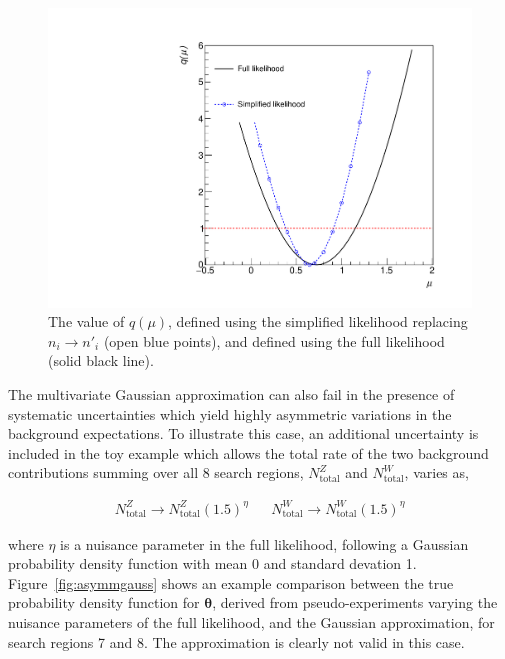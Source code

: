 \begin{figure}[hbt]
  \begin{center} 
   \includegraphics[width=1.5\cmsFigWidth]{figures/r_bias.pdf}
   \caption{The value of $q(\mu)$,  defined using the simplified likelihood replacing $n_{i}\rightarrow n'_{i}$ 
   (open blue points), and defined using the full likelihood (solid black line).}
   \label{fig:likelihoodscan_bias} 
  \end{center}
\end{figure}

The multivariate Gaussian approximation can also fail in the presence of systematic uncertainties which yield highly asymmetric 
variations in the background expectations. To illustrate this case, an additional uncertainty is included in the toy example which 
allows the total rate of the two background contributions summing over all 8 search regions, $N^{Z}_\mathrm{total}$ and $N^{W}_{\mathrm{total}}$, 
varies as,

\begin{align}
N^{Z}_{\mathrm{total}} \rightarrow N^{Z}_{\mathrm{total}}(1.5)^{\eta} && N^{W}_{\mathrm{total}} \rightarrow N^{W}_{\mathrm{total}}(1.5)^{\eta}
\label{eq:meh}
\end{align}

where $\eta$ is a nuisance parameter in the full likelihood, following a Gaussian probability density function with mean 0 and standard devation 1. 
Figure~\ref{fig:asymmgauss} shows an example comparison between the 
true probability density function for $\boldsymbol{\theta}$, derived from pseudo-experiments varying the nuisance parameters  
of the full likelihood, and the Gaussian approximation, for search regions 7 and 8. The approximation is clearly not valid in this case. 

